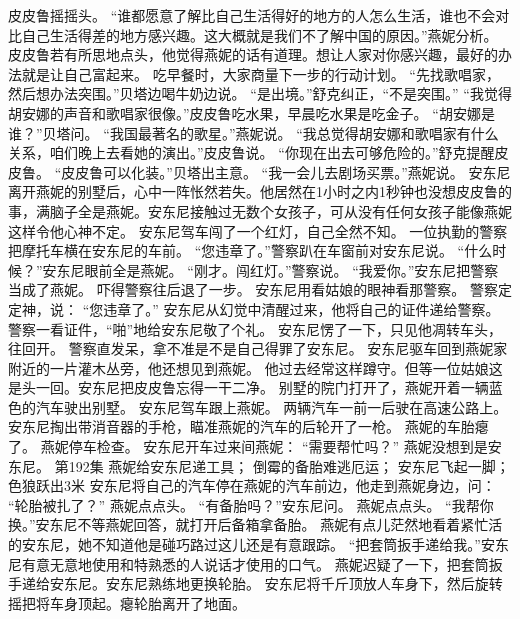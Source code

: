 \documentclass[a4paper,12pt,UTF8,twoside]{ctexbook}
\begin{document}
        皮皮鲁摇摇头。 
        “谁都愿意了解比自己生活得好的地方的人怎么生活，谁也不会对比自己生活得差的地方感兴趣。这大概就是我们不了解中国的原因。”燕妮分析。 
        皮皮鲁若有所思地点头，他觉得燕妮的话有道理。想让人家对你感兴趣，最好的办法就是让自己富起来。 
        吃早餐时，大家商量下一步的行动计划。 
        “先找歌唱家，然后想办法突围。”贝塔边喝牛奶边说。 
        “是出境。”舒克纠正，“不是突围。” 
        “我觉得胡安娜的声音和歌唱家很像。”皮皮鲁吃水果，早晨吃水果是吃金子。 
        “胡安娜是谁？”贝塔问。 
        “我国最著名的歌星。”燕妮说。 
        “我总觉得胡安娜和歌唱家有什么关系，咱们晚上去看她的演出。”皮皮鲁说。 
        “你现在出去可够危险的。”舒克提醒皮皮鲁。 
        “皮皮鲁可以化装。”贝塔出主意。 
        “我一会儿去剧场买票。”燕妮说。 
        安东尼离开燕妮的别墅后，心中一阵怅然若失。他居然在1小时之内1秒钟也没想皮皮鲁的事，满脑子全是燕妮。安东尼接触过无数个女孩子，可从没有任何女孩子能像燕妮这样令他心神不定。 
        安东尼驾车闯了一个红灯，自己全然不知。 
        一位执勤的警察把摩托车横在安东尼的车前。 
        “您违章了。”警察趴在车窗前对安东尼说。 
        “什么时候？”安东尼眼前全是燕妮。 
        “刚才。闯红灯。”警察说。 
        “我爱你。”安东尼把警察当成了燕妮。 
        吓得警察往后退了一步。 
        安东尼用看姑娘的眼神看那警察。 
        警察定定神，说： 
        “您违章了。” 
        安东尼从幻觉中清醒过来，他将自己的证件递给警察。 
        警察一看证件，“啪”地给安东尼敬了个礼。 
        安东尼愣了一下，只见他凋转车头，往回开。 
        警察直发呆，拿不准是不是自己得罪了安东尼。 
        安东尼驱车回到燕妮家附近的一片灌木丛旁，他还想见到燕妮。 
        他过去经常这样蹲守。但等一位姑娘这是头一回。安东尼把皮皮鲁忘得一干二净。 
        别墅的院门打开了，燕妮开着一辆蓝色的汽车驶出别墅。 
        安东尼驾车跟上燕妮。 
        两辆汽车一前一后驶在高速公路上。安东尼掏出带消音器的手枪，瞄准燕妮的汽车的后轮开了一枪。 
        燕妮的车胎瘪了。 
        燕妮停车检查。 
        安东尼开车过来间燕妮： 
        “需要帮忙吗？” 
        燕妮没想到是安东尼。   第192集 
        燕妮给安东尼递工具； 
        倒霉的备胎难逃厄运； 
        安东尼飞起一脚； 
        色狼跃出3米   
        安东尼将自己的汽车停在燕妮的汽车前边，他走到燕妮身边，问： 
        “轮胎被扎了？” 
        燕妮点点头。 
        “有备胎吗？”安东尼问。 
        燕妮点点头。 
        “我帮你换。”安东尼不等燕妮回答，就打开后备箱拿备胎。 
        燕妮有点儿茫然地看着紧忙活的安东尼，她不知道他是碰巧路过这儿还是有意跟踪。 
        “把套筒扳手递给我。”安东尼有意无意地使用和特熟悉的人说话才使用的口气。 
        燕妮迟疑了一下，把套筒扳手递给安东尼。安东尼熟练地更换轮胎。 
        安东尼将千斤顶放人车身下，然后旋转摇把将车身顶起。瘪轮胎离开了地面。 
\end{document}
